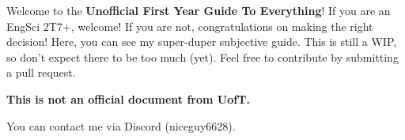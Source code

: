 Welcome to the \textbf{Unofficial First Year Guide To Everything}! If you are an EngSci 2T7+, welcome! If you are not, congratulations on making the right decision! Here, you can see my super-duper subjective guide. This is still a WIP, so don't expect there to be too much (yet). Feel free to contribute by submitting a pull request.

\bigskip
\centerline{\textbf{This is not an official document from UofT.}}
\bigskip

You can contact me via Discord (niceguy6628).
